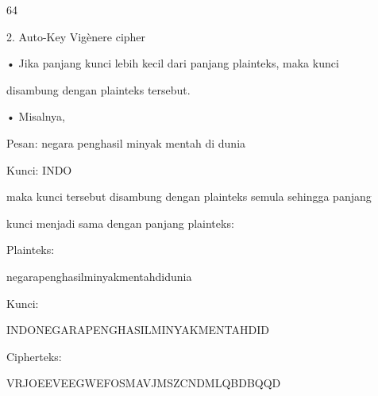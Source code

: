 \documentclass{article}
\begin{document}

64

2. Auto-Key Vigènere cipher

• Jika panjang kunci lebih kecil dari panjang plainteks, maka kunci 

disambung dengan plainteks tersebut. 

• Misalnya, 


Pesan: negara penghasil minyak mentah di dunia


Kunci:  INDO

 maka kunci tersebut disambung dengan plainteks semula sehingga panjang 

kunci menjadi  sama dengan panjang plainteks:


Plainteks: 

negarapenghasilminyakmentahdidunia


Kunci:       

INDONEGARAPENGHASILMINYAKMENTAHDID


Cipherteks: 

VRJOEEVEEGWEFOSMAVJMSZCNDMLQBDBQQD
\end{document}
